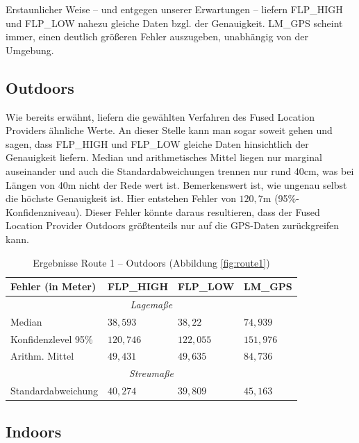 Erstaunlicher Weise -- und entgegen unserer Erwartungen -- liefern FLP\_HIGH und FLP\_LOW nahezu gleiche Daten bzgl. der Genauigkeit. LM\_GPS scheint immer, einen deutlich größeren Fehler auszugeben, unabhängig von der Umgebung.

\subsection{Outdoors}

Wie bereits erwähnt, liefern die gewählten Verfahren des Fused Location Providers ähnliche Werte. An dieser Stelle kann man sogar soweit gehen und sagen, dass FLP\_HIGH und FLP\_LOW gleiche Daten hinsichtlich der Genauigkeit liefern. Median und arithmetisches Mittel liegen nur marginal auseinander und auch die Standardabweichungen trennen nur rund 40cm, was bei Längen von 40m nicht der Rede wert ist. Bemerkenswert ist, wie ungenau selbst die höchste Genauigkeit ist. Hier entstehen Fehler von $120,7$m (95\%-Konfidenzniveau). Dieser Fehler könnte daraus resultieren, dass der Fused Location Provider Outdoors größtenteils nur auf die GPS-Daten zurückgreifen kann.

\renewcommand{\arraystretch}{1.2}
\begin{table}[h!]
	\centering
	\caption{Ergebnisse Route 1 -- Outdoors (Abbildung \ref{fig:route1})}
	\begin{tabular}{|l|l|l|l|}
	\hline
	Fehler (in Meter) & FLP\_HIGH & FLP\_LOW & LM\_GPS \\
	\hline
	\multicolumn{4}{|c|}{\textit{Lagemaße}}\\
	\hline
	Median & $38,593$ & $38,22$ & $74,939$ \\
	Konfidenzlevel 95\% & $120,746$ & $122,055$ & $151,976$ \\
	Arithm. Mittel & $49,431$ & $49,635$ & $84,736$ \\
	\hline
	\multicolumn{4}{|c|}{\textit{Streumaße}}\\
	\hline
	Standardabweichung & $40,274$ & $39,809$ & $45,163$ \\
	\hline
	\end{tabular}
\end{table}

\subsection{Indoors}



